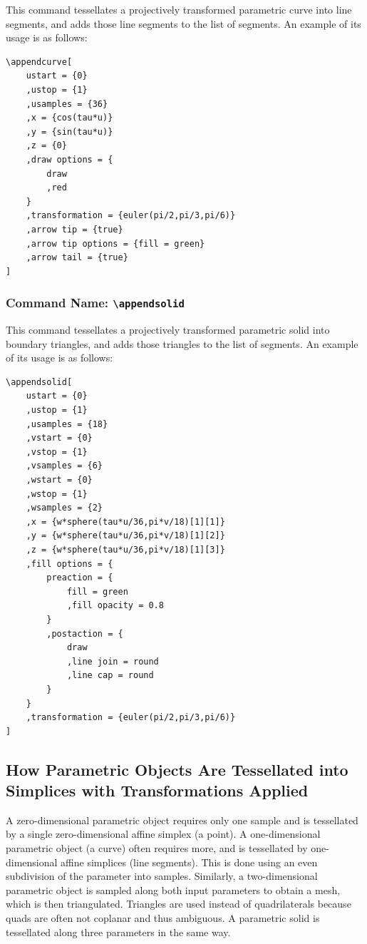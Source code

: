 This command tessellates a projectively transformed parametric curve 
into line segments, and adds those line segments to the list of 
segments. An example of its usage is as follows:
\begin{verbatim}
\appendcurve[
    ustart = {0}
    ,ustop = {1}
    ,usamples = {36}
    ,x = {cos(tau*u)}
    ,y = {sin(tau*u)}
    ,z = {0}
    ,draw options = {
        draw
        ,red
    }
    ,transformation = {euler(pi/2,pi/3,pi/6)}
    ,arrow tip = {true}
    ,arrow tip options = {fill = green}
    ,arrow tail = {true}
]
\end{verbatim}

\subsubsection{Command Name: \texttt{\textbackslash appendsolid}}

This command tessellates a projectively transformed parametric solid 
into boundary triangles, and adds those triangles to the list of 
segments. An example of its usage is as follows:
\begin{verbatim}
\appendsolid[
    ustart = {0}
    ,ustop = {1}
    ,usamples = {18}
    ,vstart = {0}
    ,vstop = {1}
    ,vsamples = {6}
    ,wstart = {0}
    ,wstop = {1}
    ,wsamples = {2}
    ,x = {w*sphere(tau*u/36,pi*v/18)[1][1]}
    ,y = {w*sphere(tau*u/36,pi*v/18)[1][2]}
    ,z = {w*sphere(tau*u/36,pi*v/18)[1][3]}
    ,fill options = {
        preaction = {
            fill = green
            ,fill opacity = 0.8
        }
        ,postaction = {
            draw
            ,line join = round
            ,line cap = round
        }
    }
    ,transformation = {euler(pi/2,pi/3,pi/6)}
]
\end{verbatim}

\subsection{How Parametric Objects Are Tessellated into Simplices with Transformations Applied}

A zero-dimensional parametric object requires only one sample and 
is tessellated by a single zero-dimensional affine simplex (a point).  
A one-dimensional parametric object (a curve) often requires more, 
and is tessellated by one-dimensional affine simplices (line segments).  
This is done using an even subdivision of the parameter into samples.  
Similarly, a two-dimensional parametric object is sampled along both 
input parameters to obtain a mesh, which is then triangulated. 
Triangles are used instead of quadrilaterals because quads are often 
not coplanar and thus ambiguous. A parametric solid is tessellated 
along three parameters in the same way.

